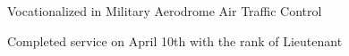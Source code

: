 \begin{cvitemize}
    \item Vocationalized in Military Aerodrome Air Traffic Control
    \item Completed service on April 10th with the rank of Lieutenant
\end{cvitemize}